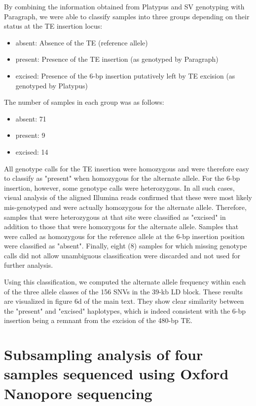 \documentclass[12pt]{article}
\begin{document}
By combining the information obtained from Platypus and SV genotyping with Paragraph, we were able to classify samples into three groups depending on their status at the TE insertion locus:

\begin{itemize}
	\item absent: Absence of the TE (reference allele)
	\item present: Presence of the TE insertion (as genotyped by Paragraph)
	\item excised: Presence of the 6-bp insertion putatively left by TE excision (as genotyped by Platypus)
\end{itemize}

The number of samples in each group was as follows:

\begin{itemize}
	\item absent: 71 
	\item present: 9
	\item excised: 14
\end{itemize}

All genotype calls for the TE insertion were homozygous and were therefore easy to classify as "present" when homozygous for the alternate allele.
For the 6-bp insertion, however, some genotype calls were heterozygous. 
In all such cases, visual analysis of the aligned Illumina reads confirmed that these were most likely mis-genotyped and were actually homozygous for the alternate allele.
Therefore, samples that were heterozygous at that site were classified as "excised" in addition to those that were homozygous for the alternate allele.
Samples that were called as homozygous for the reference allele at the 6-bp insertion position were classified as "absent".
Finally, eight (8) samples for which missing genotype calls did not allow unambiguous classification were discarded and not used for further analysis.

Using this classification, we computed the alternate allele frequency within each of the three allele classes of the 156 SNVs in the 39-kb LD block.
These results are visualized in figure 6d of the main text.
They show clear similarity between the "present" and "excised" haplotypes, which is indeed consistent with the 6-bp insertion being a remnant from the excision of the 480-bp TE.

\clearpage

\section{Subsampling analysis of four samples sequenced using Oxford Nanopore sequencing}
\end{document}
